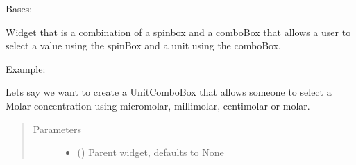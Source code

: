 \documentclass[letterpaper,10pt,english]{sphinxmanual}
\begin{document}
\begin{fulllineitems}
\label{\detokenize{polo.widgets:polo.widgets.unit_combo.UnitComboBox}}
Bases: 

Widget that is a combination of a spinbox and a
comboBox that allows a user to select a value using the
spinBox and a unit using the comboBox.

Example:

Lets say we want to create a UnitComboBox that allows someone
to select a Molar concentration using micro\sphinxhyphen{}molar, milli\sphinxhyphen{}molar,
centi\sphinxhyphen{}molar or molar.

\begin{sphinxVerbatim}[commandchars=\\\{\}]
  
         
  
      
\end{sphinxVerbatim}
\begin{quote}\begin{description}
\item[{Parameters}] \leavevmode\begin{itemize}
\item {} 
 (\sphinxstyleliteralemphasis{\sphinxupquote{, }}) \textendash{} Parent widget, defaults to None


\end{itemize}
\end{description}
\end{quote}
\end{fulllineitems}
\end{document}
